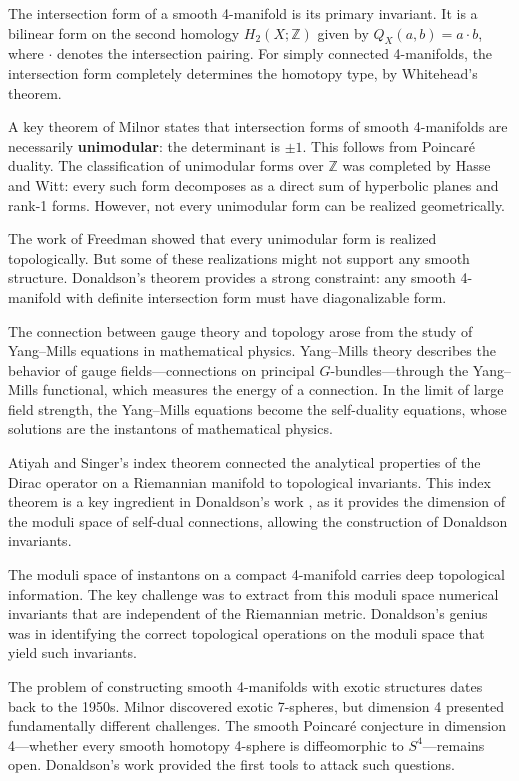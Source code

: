 The intersection form of a smooth 4-manifold is its primary invariant. It is a bilinear form on the second homology $H_2(X;\mathbb{Z})$ given by $Q_X(a,b) = a \cdot b$, where $\cdot$ denotes the intersection pairing. For simply connected 4-manifolds, the intersection form completely determines the homotopy type, by Whitehead's theorem.

A key theorem of Milnor states that intersection forms of smooth 4-manifolds are necessarily \textbf{unimodular}: the determinant is $\pm 1$. This follows from Poincaré duality. The classification of unimodular forms over $\mathbb{Z}$ was completed by Hasse and Witt: every such form decomposes as a direct sum of hyperbolic planes and rank-1 forms. However, not every unimodular form can be realized geometrically.

The work of Freedman showed that every unimodular form is realized topologically. But some of these realizations might not support any smooth structure. Donaldson's theorem provides a strong constraint: any smooth 4-manifold with definite intersection form must have diagonalizable form.

The connection between gauge theory and topology arose from the study of Yang--Mills equations in mathematical physics. Yang--Mills theory describes the behavior of gauge fields---connections on principal $G$-bundles---through the Yang--Mills functional, which measures the energy of a connection. In the limit of large field strength, the Yang--Mills equations become the self-duality equations, whose solutions are the instantons of mathematical physics.

Atiyah and Singer's index theorem connected the analytical properties of the Dirac operator on a Riemannian manifold to topological invariants. This index theorem is a key ingredient in Donaldson's work \cite{donaldson1983}, as it provides the dimension of the moduli space of self-dual connections, allowing the construction of Donaldson invariants.

The moduli space of instantons on a compact 4-manifold carries deep topological information. The key challenge was to extract from this moduli space numerical invariants that are independent of the Riemannian metric. Donaldson's genius was in identifying the correct topological operations on the moduli space that yield such invariants.

The problem of constructing smooth 4-manifolds with exotic structures dates back to the 1950s. Milnor discovered exotic 7-spheres, but dimension 4 presented fundamentally different challenges. The smooth Poincaré conjecture in dimension 4---whether every smooth homotopy 4-sphere is diffeomorphic to $S^4$---remains open. Donaldson's work \cite{donaldson1983} provided the first tools to attack such questions.

